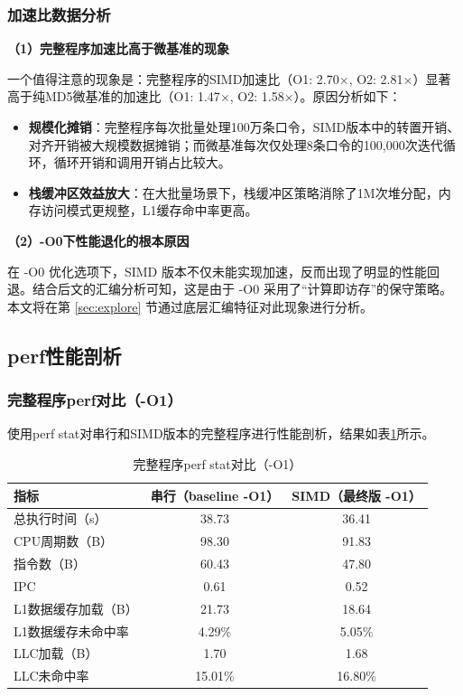\documentclass[UTF8,a4paper,10pt]{ctexart}
\begin{document}
\subsubsection{加速比数据分析}

\noindent\textbf{（1）完整程序加速比高于微基准的现象}

一个值得注意的现象是：完整程序的SIMD加速比（O1: 2.70$\times$, O2: 2.81$\times$）显著高于纯MD5微基准的加速比（O1: 1.47$\times$, O2: 1.58$\times$）。原因分析如下：

\begin{itemize}
  \item \textbf{规模化摊销}：完整程序每次批量处理100万条口令，SIMD版本中的转置开销、对齐开销被大规模数据摊销；而微基准每次仅处理8条口令的100,000次迭代循环，循环开销和调用开销占比较大。
  \item \textbf{栈缓冲区效益放大}：在大批量场景下，栈缓冲区策略消除了1M次堆分配，内存访问模式更规整，L1缓存命中率更高。
\end{itemize}

\noindent\textbf{（2）-O0下性能退化的根本原因}

在 -O0 优化选项下，SIMD 版本不仅未能实现加速，反而出现了明显的性能回退。结合后文的汇编分析可知，这是由于 -O0 采用了“计算即访存”的保守策略。本文将在第 \ref{sec:explore} 节通过底层汇编特征对此现象进行分析。
\subsection{perf性能剖析}

\subsubsection{完整程序perf对比（-O1）}

使用perf stat对串行和SIMD版本的完整程序进行性能剖析，结果如表\ref{tab:perf-full}所示。

\begin{table}[!htbp]
  \centering
  \begin{tabular}{lcc}
  \toprule
  指标 & 串行（baseline -O1） & SIMD（最终版 -O1） \\
  \midrule
  总执行时间（s） & 38.73 & 36.41 \\
  CPU周期数（B） & 98.30 & 91.83 \\
  指令数（B） & 60.43 & 47.80 \\
  IPC & 0.61 & 0.52 \\
  L1数据缓存加载（B） & 21.73 & 18.64 \\
  L1数据缓存未命中率 & 4.29\% & 5.05\% \\
  LLC加载（B） & 1.70 & 1.68 \\
  LLC未命中率 & 15.01\% & 16.80\% \\
  \bottomrule
  \end{tabular}
  \caption{完整程序perf stat对比（-O1）}
  \label{tab:perf-full}
\end{table}
\end{document}
